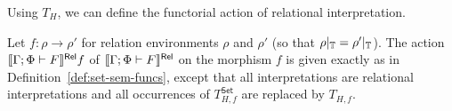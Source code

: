 \documentclass{lmcs}
\theoremstyle{plain}\newtheorem{satz}[thm]{Satz}
\newcommand{\inl}{\mathsf{inl}}
\newcommand{\inr}{\mathsf{inr}}
\newcommand{\set}{\mathsf{Set}}
\renewcommand{\id}{\mathit{id}}
\begin{document}
{Using $T_H$, we can define the functorial action of relational
interpretation.
\begin{defi}\label{def:rel-sem-funcs}
Let $f: \rho \to \rho'$ for relation environments $\rho$ and $\rho'$
(so that $\rho|_{\mathbb{T}} = \rho'|_{\mathbb{T}}$). The action
$\llbracket{\Gamma;\Phi \vdash F}\rrbracket^{\mathsf{Rel}}f$ of $\llbracket{\Gamma;\Phi \vdash F}\rrbracket^{\mathsf{Rel}}$ on
the morphism $f$ is given exactly as in
Definition~\ref{def:set-sem-funcs}, except that all interpretations
are relational interpretations and all occurrences of $T^\set_{H,f}$
are replaced by $T_{H,f}$.
\begin{comment}
as follows:
\begin{itemize}
\item If \,$\Gamma;\Phi \vdash \zerot$ then $\relsem{\Gamma;\Phi \vdash
  \zerot}f = \id_0$
\item If\, $\Gamma;\Phi \vdash \onet$ then $\relsem{\Gamma;\Phi \vdash
  \onet}f = \id_1$
\item If \,$\Gamma; \Phi
  \vdash \Nat^{\ol{\alpha}}\,F\,G$ then
  $\relsem{\Gamma; \Phi
    \vdash \Nat^{\ol{\alpha}}\,F\,G} f =$\\
\hspace*{0.2in} $\lambda t : \relsem{\Gamma;\Phi \vdash
    \Nat^{\ol{\alpha}}\,F\,G}\rho.\, 
  (\lambda \ol{A}. \relsem{\Gamma; \Phi,\ol\alpha \vdash G}f[\ol{\alpha
      := id_A}]) \circ t$  
\item If \,$\Gamma;\Phi \vdash \phi \ol{\tau}$, then
  $\relsem{\Gamma;\Phi \vdash \phi \ol{\tau}} f : \relsem{\Gamma;\Phi
  \vdash \phi \ol{\tau}}\rho \to \relsem{\Gamma;\Phi \vdash \phi
  \ol{\tau}}\rho' = (\rho\phi) \ol{\relsem{\Gamma;\Phi \vdash
    \tau}\rho} \to (\rho'\phi) \ol{\relsem{\Gamma;\Phi \vdash
    \tau}\rho'}$ is defined by $\relsem{\Gamma;\Phi \vdash \phi
  \tau{A}} f = (f\phi)_{\ol{\relsem{\Gamma;\Phi \vdash \tau}\rho'}}
  \,\circ\, (\rho\phi) \ol{\relsem{\Gamma;\Phi \vdash \tau}f} =
  (\rho'\phi) \ol{\relsem{\Gamma;\Phi \vdash \tau}f} \,\circ\, (f
  \phi)_{\ol{\relsem{\Gamma;\Phi \vdash \tau}\rho}}$
\item If\, $\Gamma;\Phi\vdash \sigma + \tau$ then $\relsem{\Gamma;\Phi
  \vdash \sigma + \tau}f$ is defined by $\relsem{\Gamma;\Phi \vdash
  \sigma + \tau}f(\inl\,x) = \inl\,(\relsem{\Gamma;\Phi \vdash
  \sigma}f x)$ and $\relsem{\Gamma;\Phi \vdash \sigma +
  \tau}f(\inr\,y) = \inr\,(\relsem{\Gamma;\Phi \vdash \tau}f y)$
\item If\, $\Gamma;\Phi\vdash \sigma \times \tau$ then
  $\relsem{\Gamma;\Phi \vdash \sigma \times \tau}f =
  \relsem{\Gamma;\Phi \vdash \sigma}f \times \relsem{\Gamma;\Phi
    \vdash \tau}f$
\item If\, $\Gamma;\Phi \vdash (\mu \phi^k.\lambda
  \ol{\alpha}. H)\ol{\tau}$ then $\relsem{\Gamma;\Phi \vdash (\mu
    \phi.\lambda \ol{\alpha}. H)\ol{\tau}} f = (\mu
  T_{H,f})\ol{\relsem{\Gamma;\Phi \vdash \tau}\rho'} \circ (\mu
  T_{H,\rho})\ol{\relsem{\Gamma;\Phi \vdash \tau}f} = (\mu
  T_{H,\rho'})\ol{\relsem{\Gamma;\Phi \vdash \tau}f} \circ (\mu
  T_{H,f})\ol{\relsem{\Gamma;\Phi \vdash \tau}\rho}$
\end{itemize}
\end{comment}
\end{defi}

}
\end{document}
